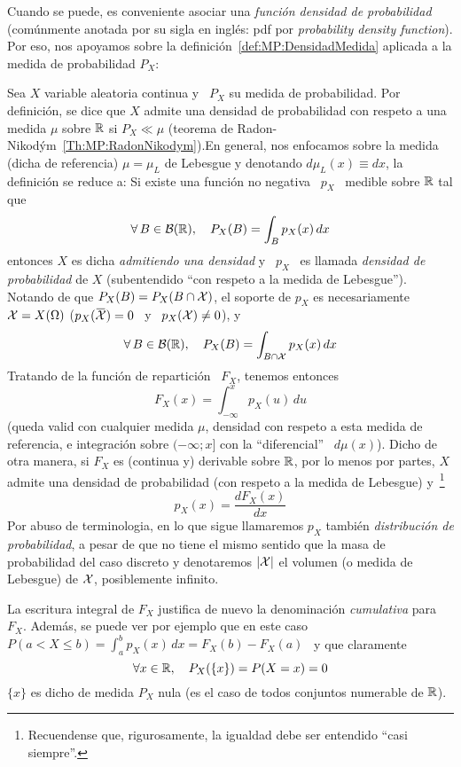 Cuando  se  puede,  es  conveniente  asociar  una  {\it  funci\'on  densidad  de
  probabilidad} (com\'unmente  anotada por  su sigla en  ingl\'es: pdf  por {\it
  probability   density   function}).   Por   eso,   nos   apoyamos   sobre   la
definici\'on~\ref{def:MP:DensidadMedida}  aplicada a  la medida  de probabilidad
$P_X$:
%
\begin{definicion}
  Sea $X$ variable  aleatoria continua y \ $P_X$ su  medida de probabilidad. Por
  definici\'on, se dice que $X$  admite una densidad de probabilidad con respeto
  a   una  medida   $\mu$  sobre   $\mathbb{R}$  si   $P_X  \ll   \mu$   (teorema  de
  Radon-Nikod\'ym~\ref{Th:MP:RadonNikodym}).\newline En  general, nos enfocamos
  sobre la  medida (dicha de referencia)  $\mu = \mu_L$ de  Lebesgue y denotando
  $d\mu_L(x) \equiv dx$, la definici\'on se reduce a: Si existe una funci\'on no
  negativa \ $p_X$ \ medible sobre $\mathbb{R}$ tal que
  \[
  \forall \, B \in \mathcal{B}(\mathbb{R}), \quad P_X(B) = \int_B p_X(x) \, dx
  \]
  entonces $X$  es dicha {\it  admitiendo una densidad}  y \ $p_X$ \  es llamada
  {\it densidad de probabilidad} de  $X$ (subentendido ``con respeto a la medida
  de Lebesgue'').  Notando de que $P_X(B) = P_X(B \cap \mathcal{X})$, el soporte de $p_X$
  es necesariamente $\mathcal{X} = X(\Omega)$ (\ie $p_X(\widebar{\X}) = 0$ \ y \ $p_X(\mathcal{X})
  \ne 0$), y
  \[
  \forall \, B \in \mathcal{B}(\mathbb{R}), \quad P_X(B) = \int_{B \cap \mathcal{X}} p_X(x) \, dx
  \]
  Tratando de la funci\'on de repartici\'on \ $F_X$, tenemos entonces
  \[
  F_X(x) = \int_{-\infty}^x p_X(u) \, du
  \]
  (queda valid con cualquier medida $\mu$, densidad con respeto a esta medida de
  referencia,  e integraci\'on  sobre $(-\infty;  x]$ con  la  ``diferencial'' \
  $d\mu(x)$).  Dicho  de otra manera, si  $F_X$ es (continua  y) derivable sobre
  $\mathbb{R}$, por lo menos por partes, $X$ admite una densidad de probabilidad (con
  respeto a  la medida de Lebesgue)  y~\footnote{Recuendense que, rigurosamente,
    la igualdad debe ser entendido ``casi siempre''.}
  \[
  p_X(x) = \frac{d F_X(x)}{dx}
  \]
  Por abuso  de terminologia,  en lo que  sigue llamaremos $p_X$  tambi\'en {\it
    distribuci\'on de  probabilidad}, a pesar de  que no tiene  el mismo sentido
  que la masa de probabilidad del  caso discreto y denotaremos $|\mathcal{X}|$ el volumen
  (o medida de Lebesgue) de $\mathcal{X}$, posiblemente infinito.
\end{definicion}
%
La  escritura  integral de  $F_X$  justifica  de  nuevo la  denominaci\'on  {\it
  cumulativa} para  $F_X$. Adem\'as, se puede  ver por ejemplo que  en este caso
$\displaystyle P(a < X \le b) = \int_a^b p_X(x) \, dx = F_X(b) - F_X(a)$ \ y que
claramente
%
\[
\forall x \in \mathbb{R}, \quad P_X(\{x\}) = P(X = x) = 0
\]
%
$\{ x \}$ es dicho de medida $P_X$ nula (es el caso de todos conjuntos numerable
de $\mathbb{R}$).

